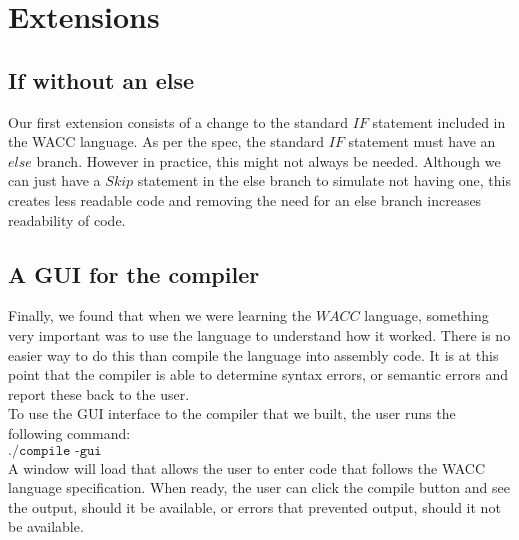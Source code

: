 \documentclass[a4paper, 11pt]{article} %
\begin{document}
\section*{Extensions}


\subsection*{If without an else}
Our first extension consists of a change to the standard $ IF $ statement included in the WACC language. As per the spec, the standard $ IF $ statement must have an $ else $ branch. However in practice, this might not always be needed. Although we can just have a $ Skip $ statement in the else branch to simulate not having one, this creates less readable code and removing the need for an else branch increases readability of code.




\subsection*{A GUI for the compiler}

Finally, we found that when we were learning the $ WACC $ language, something very important was to use the language to understand how it worked. There is no easier way to do this than compile the language into assembly code. It is at this point that the compiler is able to determine syntax errors, or semantic errors and report these back to the user. \\

To use the GUI interface to the compiler that we built, the user runs the following command: \\

\begin{math}
\texttt{./compile -gui}
\end{math} \\

A window will load that allows the user to enter code that follows the WACC language specification. When ready, the user can click the compile button and see the output, should it be available, or errors that prevented output, should it not be available.

\end{document}
